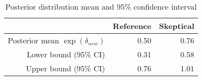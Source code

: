 \begin{table}[htbp]
\centering
\begin{tabular}{rrr}
  \hline
 & Reference & Skeptical \\ 
  \hline
Posterior mean $\exp(\delta_{new})$ & 0.50 & 0.76 \\ 
  Lower bound (95\% CI) & 0.31 & 0.58 \\ 
  Upper bound (95\% CI) & 0.76 & 1.01 \\ 
   \hline
\end{tabular}
\caption{Posterior distribution mean and 95\% confidence interval} 
\label{tab:sum_post_dist}
\end{table}

